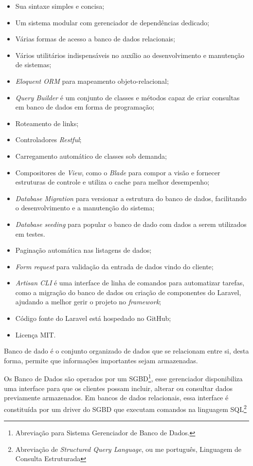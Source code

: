 \documentclass[
  12pt,				%
  openany,
  oneside,
  a4paper,			%
  english,			%
  brazil
]{article}
\numberwithin{figure}{section}
\numberwithin{table}{section}
\newcounter{subsubsubsection}[subsubsection]
\begin{document}
{\singlespacing
\begin{itemize}
  \item Sua sintaxe simples e concisa;
  \item Um sistema modular com gerenciador de dependências dedicado;
  \item Várias formas de acesso a banco de dados relacionais;
  \item Vários utilitários indispensáveis no auxílio ao desenvolvimento e manutenção de sistemas;
  \item \textit{Eloquent ORM} para mapeamento objeto-relacional;
  \item \textit{Query Builder} é um conjunto de classes e métodos capaz de criar consultas em banco de dados em forma de programação;
  \item Roteamento de links;
  \item Controladores \textit{Restful};
  \item Carregamento automático de classes sob demanda;
  \item Compositores de \textit{View}, como o \textit{Blade} para compor a visão e fornecer estruturas de controle e utiliza o cache para melhor desempenho;
  \item \textit{Database Migration} para versionar a estrutura do banco de dados, facilitando o desenvolvimento e a manutenção do sistema;
  \item \textit{Database seeding} para popular o banco de dado com dados a serem utilizados em testes.
  \item Paginação automática nas listagens de dados;
  \item \textit{Form request} para validação da entrada de dados vindo do cliente;
  \item \textit{Artisan CLI} é uma interface de linha de comandos para automatizar tarefas, como a migração do banco de dados ou criação de componentes do Laravel, ajudando a melhor gerir o projeto no \textit{framework};
  \item Código fonte do Laravel está hospedado no GitHub;
  \item Licença MIT.
\end{itemize}
}


Banco de dado é o conjunto organizado de dados que se relacionam entre si, desta forma, permite que informações importantes sejam armazenadas.

Os Banco de Dados são operados por um SGBD\footnote{Abreviação para Sistema Gerenciador de Banco de Dados.}, esse gerenciador disponibiliza uma interface para que os clientes possam incluir, alterar ou consultar dados previamente armazenados. Em bancos de dados relacionais, essa interface é constituída por um driver do SGBD que executam comandos na linguagem SQL\footnote{Abreviação de \textit{Structured Query Language}, ou me português, Linguagem de Consulta Estruturada}
\end{document}
